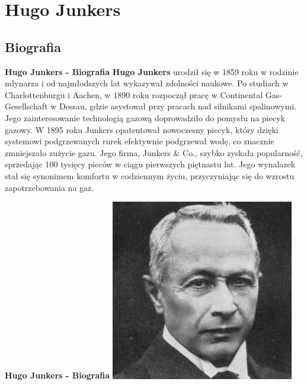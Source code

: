 
\section{ \textbf{Hugo Junkers}}

\subsection{Biografia}

\begin{frame}{\textbf{Hugo Junkers - Biografia}}
\textbf{Hugo Junkers} urodził się w 1859 roku w rodzinie młynarza i od najmłodszych lat wykazywał zdolności naukowe. Po studiach w Charlottenburgu i Aachen, w 1890 roku rozpoczął pracę w Continental Gas-Gesellschaft w Dessau, gdzie asystował przy pracach nad silnikami spalinowymi. Jego zainteresowanie technologią gazową doprowadziło do pomysłu na piecyk gazowy.
W 1895 roku Junkers opatentował nowoczesny piecyk, który dzięki systemowi podgrzewanych rurek efektywnie podgrzewał wodę, co znacznie zmniejszało zużycie gazu. Jego firma, Junkers \& Co., szybko zyskała popularność, sprzedając 100 tysięcy pieców w ciągu pierwszych piętnastu lat. Jego wynalazek stał się synonimem komfortu w codziennym życiu, przyczyniając się do wzrostu zapotrzebowania na gaz.
\end{frame}

\begin{frame}{\textbf{Hugo Junkers - Biografia}}
\includegraphics[width=8cm]{images/hugo-01.jpg}
\end{frame}

